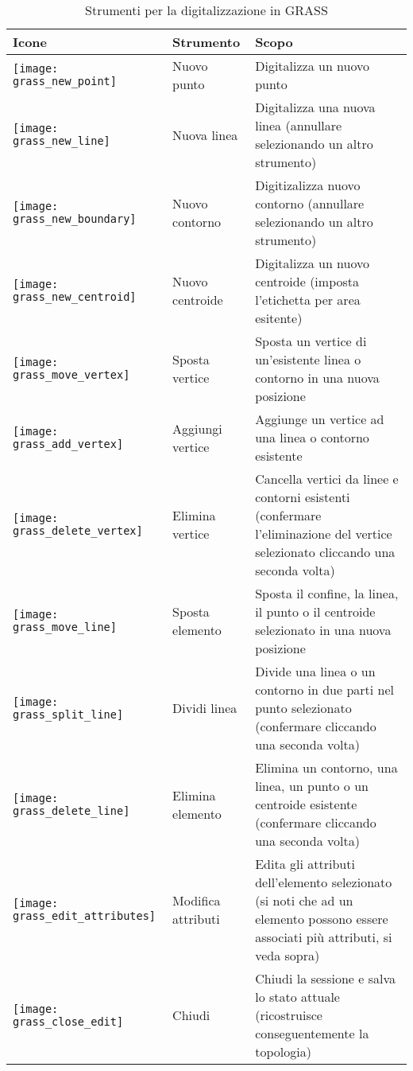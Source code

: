 \begin{table}[h]
\centering
\caption{Strumenti per la digitalizzazione in GRASS}\label{tab:grass_tools}\medskip
 \begin{tabular}{|l|l|p{5in}|}
 \hline \textbf{Icone} & \textbf{Strumento} & \textbf{Scopo} \\
\hline \texttt{[image: grass\_new\_point]} & Nuovo punto &
Digitalizza un nuovo punto \\
\hline \texttt{[image: grass\_new\_line]} & Nuova linea &
Digitalizza una nuova linea (annullare selezionando un altro strumento) \\
\hline \texttt{[image: grass\_new\_boundary]} & Nuovo contorno &
Digitizalizza nuovo contorno (annullare selezionando un altro strumento)\\
\hline \texttt{[image: grass\_new\_centroid]} & Nuovo centroide &
Digitalizza un nuovo centroide (imposta l'etichetta per area esitente)\\
\hline \texttt{[image: grass\_move\_vertex]} & Sposta vertice &
Sposta un vertice di un'esistente linea o contorno in una nuova posizione\\
\hline \texttt{[image: grass\_add\_vertex]} & Aggiungi vertice &
Aggiunge un vertice ad una linea o contorno esistente\\
\hline \texttt{[image: grass\_delete\_vertex]} & Elimina vertice &
Cancella vertici da linee e contorni esistenti (confermare l'eliminazione del
vertice selezionato cliccando una seconda volta)\\
\hline \texttt{[image: grass\_move\_line]} & Sposta elemento &
Sposta il confine, la linea, il punto o il centroide selezionato in una nuova
posizione\\
\hline \texttt{[image: grass\_split\_line]} & Dividi linea & Divide
una linea o un contorno in due parti nel punto selezionato (confermare
cliccando una seconda volta)\\
\hline \texttt{[image: grass\_delete\_line]} & Elimina elemento &
Elimina un contorno, una linea, un punto o un centroide esistente (confermare
cliccando una seconda volta)\\
\hline \texttt{[image: grass\_edit\_attributes]} & Modifica
attributi & Edita gli attributi dell'elemento selezionato (si noti che ad un
elemento possono essere associati più attributi, si veda sopra)\\
\hline \texttt{[image: grass\_close\_edit]} & Chiudi & Chiudi la
sessione e salva lo stato attuale (ricostruisce conseguentemente la topologia)\\
\hline
\end{tabular}
\end{table}


